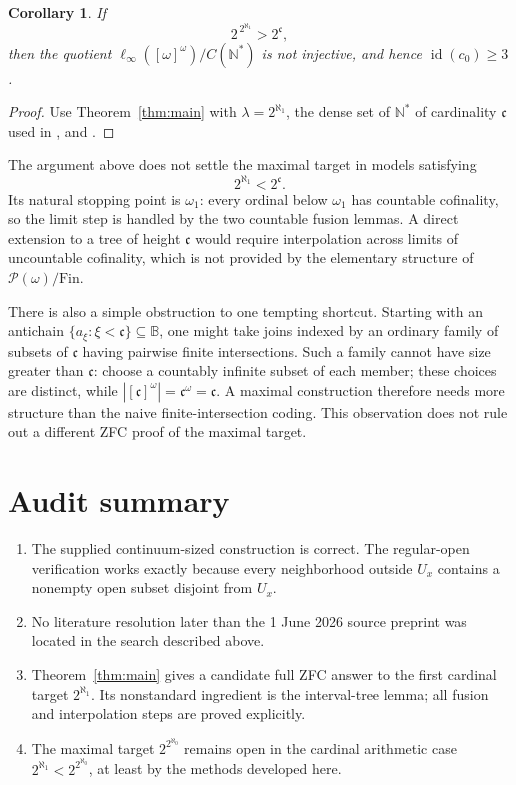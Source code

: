 \documentclass[11pt]{article}
\newtheorem{corollary}[theorem]{Corollary}
\theoremstyle{definition}
\theoremstyle{remark}
\newcommand{\B}{\mathbb B}
\newcommand{\Fin}{\mathrm{Fin}}
\begin{document}
\begin{corollary}\label{cor:banach}
If
\[
  2^{\,2^{\aleph_1}}>2^{\mathfrak c},
\]
then the quotient
\(\ell_\infty([\omega]^\omega)/C(\mathbb N^*)\) is not injective, and hence
\(\operatorname{id}(c_0)\geq3\).
\end{corollary}

\begin{proof}
Use Theorem~\ref{thm:main} with
\(\lambda=2^{\aleph_1}\), the dense set of \(\mathbb N^*\) of cardinality
\(\mathfrak c\) used in \cite{LHS}, and \cite[Theorem~B]{LHS}.
\end{proof}

The argument above does not settle the maximal target in models satisfying
\[
  2^{\aleph_1}<2^{\mathfrak c}.
\]
Its natural stopping point is \(\omega_1\): every ordinal below \(\omega_1\)
has countable cofinality, so the limit step is handled by the two countable
fusion lemmas.  A direct extension to a tree of height \(\mathfrak c\) would
require interpolation across limits of uncountable cofinality, which is not
provided by the elementary structure of \(\mathcal P(\omega)/\Fin\).

There is also a simple obstruction to one tempting shortcut.  Starting with an
antichain \(\{a_\xi:\xi<\mathfrak c\}\subseteq\B\), one might take joins
indexed by an ordinary family of subsets of \(\mathfrak c\) having pairwise
finite intersections.  Such a family cannot have size greater than
\(\mathfrak c\): choose a countably infinite subset of each member; these
choices are distinct, while
\(|[\mathfrak c]^\omega|=\mathfrak c^\omega=\mathfrak c\).  A maximal
construction therefore needs more structure than the naive finite-intersection
coding.  This observation does not rule out a different ZFC proof of the
maximal target.

\section{Audit summary}

\begin{enumerate}[leftmargin=2.2em]
\item The supplied continuum-sized construction is correct.  The regular-open
      verification works exactly because every neighborhood outside \(U_x\)
      contains a nonempty open subset disjoint from \(U_x\).
\item No literature resolution later than the 1 June 2026 source preprint was
      located in the search described above.
\item Theorem~\ref{thm:main} gives a candidate full ZFC answer to the first
      cardinal target \(2^{\aleph_1}\).  Its nonstandard ingredient is the
      interval-tree lemma; all fusion and interpolation steps are proved
      explicitly.
\item The maximal target \(2^{2^{\aleph_0}}\) remains open in the cardinal
      arithmetic case \(2^{\aleph_1}<2^{2^{\aleph_0}}\), at least by the
      methods developed here.
\end{enumerate}
\end{document}
